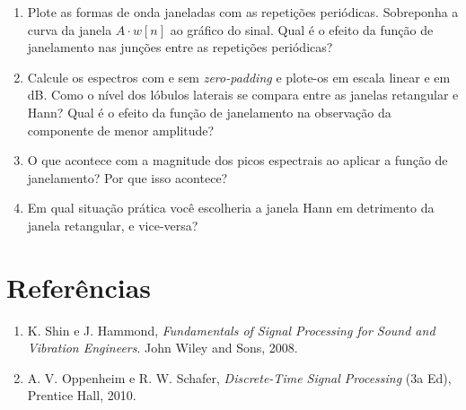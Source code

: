 \documentclass[a4paper,twoside,12pt]{article}
\begin{document}
	\begin{enumerate}
		\item Plote as formas de onda janeladas com as repetições periódicas. Sobreponha a curva da janela $A \cdot w[n]$ ao gráfico do sinal. Qual é o efeito da função de janelamento nas junções entre as repetições periódicas?
		
		\item Calcule os espectros com e sem \textit{zero-padding} e plote-os em escala linear e em dB. Como o nível dos lóbulos laterais se compara entre as janelas retangular e Hann? Qual é o efeito da função de janelamento na observação da componente de menor amplitude?
		
		\item O que acontece com a magnitude dos picos espectrais ao aplicar a função de janelamento? Por que isso acontece?
		
		\item Em qual situação prática você escolheria a janela Hann em detrimento da janela retangular, e vice-versa?
	\end{enumerate}
	
	
	\section*{Referências}
	
	\begin{enumerate}
		\item K. Shin e J. Hammond, \textit{Fundamentals of Signal Processing for Sound and Vibration Engineers}. John Wiley and Sons, 2008.
		\item A. V. Oppenheim e R. W. Schafer, \textit{Discrete-Time Signal Processing} (3a Ed), Prentice Hall, 2010.
	\end{enumerate}
	
	
\end{document}

